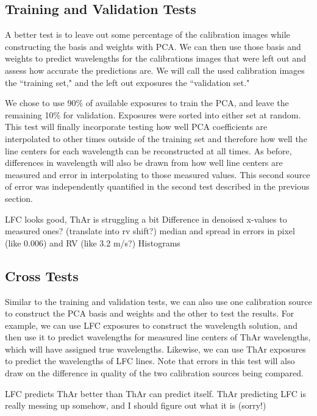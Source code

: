 \documentclass[12pt, letterpaper]{article}
\begin{document}
\subsection{Training and Validation Tests} \label{sec:test-trainNvalid}
A better test is to leave out some percentage of the calibration images while constructing the basis and weights with PCA.  We can then use those basis and weights to predict wavelengths for the calibrations images that were left out and assess how accurate the predictions are.  We will call the used calibration images the ``training set," and the left out exposures the ``validation set."

We chose to use 90\% of available exposures to train the PCA, and leave the remaining 10\% for validation.  Exposures were sorted into either set at random.  This test will finally incorporate testing how well PCA coefficients are interpolated to other times outside of the training set and therefore how well the line centers for each wavelength can be reconstructed at all times.  As before, differences in wavelength will also be drawn from how well line centers are measured and error in interpolating to those measured values.  This second source of error was independently quantified in the second test described in the previous section.

LFC looks good, ThAr is struggling a bit
Difference in denoised x-values to measured ones? (translate into rv shift?)
median and spread in errors in pixel (like 0.006) and RV (like 3.2 m/s?)
Histograms

\subsection{Cross Tests} \label{sec:test-cross}
Similar to the training and validation tests, we can also use one calibration source to construct the PCA basis and weights and the other to test the results.  For example, we can use LFC exposures to construct the wavelength solution, and then use it to predict wavelengths for measured line centers of ThAr wavelengths, which will have assigned true wavelengths.  Likewise, we can use ThAr exposures to predict the wavelengths of LFC lines.  Note that errors in this test will also draw on the difference in quality of the two calibration sources being compared.

LFC predicts ThAr better than ThAr can predict itself.
ThAr predicting LFC is really messing up somehow, and I should figure out what it is (sorry!)

\end{document}

